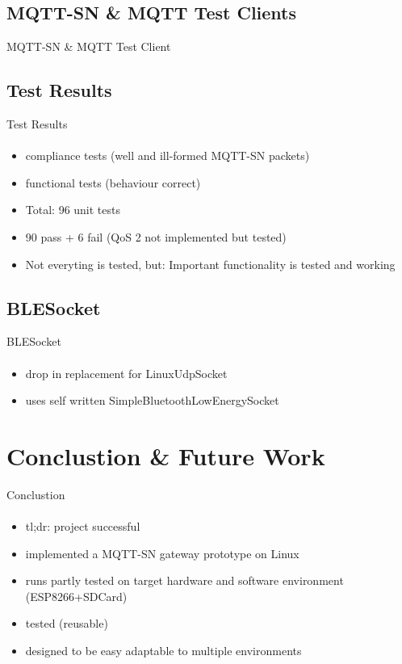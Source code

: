 \documentclass[10pt,aspectratio=\ratio,
compress
]{beamer}
\begin{document}
\subsection{MQTT-SN \& MQTT Test Clients}
\begin{frame}{MQTT-SN \& MQTT Test Client}\framesubtitle{}
\end{frame}


\subsection{Test Results}
\begin{frame}{Test Results}\framesubtitle{}
	\begin{itemize}
		\item compliance tests (well and ill-formed MQTT-SN packets)
		\item functional tests (behaviour correct)
		\item Total: 96 unit tests
		\item 90 pass + 6 fail (QoS 2 not implemented but tested)
		\item Not everyting is tested, but: Important functionality is tested and working
	\end{itemize}
\end{frame}

\subsection{BLESocket}
\begin{frame}{BLESocket}\framesubtitle{}
	\begin{itemize}
		\item drop in replacement for LinuxUdpSocket
		\item uses self written SimpleBluetoothLowEnergySocket
	\end{itemize}
\end{frame}

\section{Conclustion \& Future Work}
\begin{frame}{Conclustion}\framesubtitle{}
	\begin{itemize}
		\item tl;dr: project successful
		\item implemented a MQTT-SN gateway prototype on Linux
		\item runs partly tested on target hardware and software environment (ESP8266+SDCard)
		\item tested (reusable)
		\item designed to be easy adaptable to multiple environments
	\end{itemize}
\end{frame}
\end{document}
